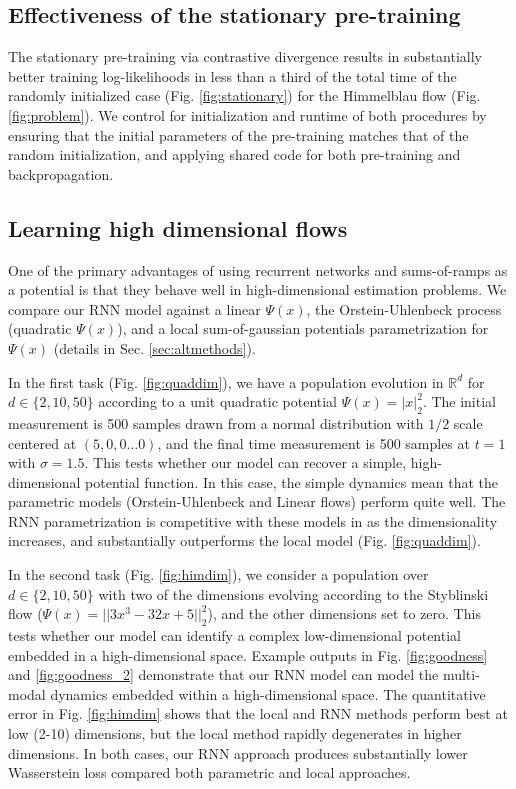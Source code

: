 \documentclass{article}
\begin{document}
\subsection{Effectiveness of the stationary pre-training}
The stationary pre-training via contrastive divergence results in substantially better training log-likelihoods in less than a third of the total time of the randomly initialized case (Fig. \ref{fig:stationary}) for the Himmelblau flow (Fig. \ref{fig:problem}). We control for initialization and runtime of both procedures by ensuring that the initial parameters of the pre-training matches that of the random initialization, and applying shared code for both pre-training and backpropagation.


\subsection{Learning high dimensional flows}

One of the primary advantages of using recurrent networks and sums-of-ramps as a potential is that they behave well in high-dimensional estimation problems. We compare our RNN model against a linear $\Psi(x)$, the Orstein-Uhlenbeck process (quadratic $\Psi(x)$), and a local sum-of-gaussian potentials parametrization for $\Psi(x)$ (details in Sec. \ref{sec:altmethods}).

In the first task (Fig. \ref{fig:quaddim}), we have a population evolution in $\mathbb{R}^d$ for $d\in \{2,10,50\}$ according to a unit quadratic potential $\Psi(x) = |x|_2^2$. The initial measurement is 500 samples drawn from a normal distribution with $1/2$ scale centered at $(5,0,0\hdots 0)$, and the final time measurement is 500 samples at $t=1$ with $\sigma=1.5$. This tests whether our model can recover a simple, high-dimensional potential function. In this case, the simple dynamics mean that the parametric models (Orstein-Uhlenbeck and Linear flows) perform quite well. The RNN parametrization is competitive with these models in as the dimensionality increases, and substantially outperforms the local model (Fig. \ref{fig:quaddim}).

In the second task (Fig. \ref{fig:himdim}), we consider a population over $d\in \{2,10,50\}$ with two of the dimensions evolving according to the Styblinski flow ($\Psi(x) = ||3x^3-32x+5||_2^2$), and the other dimensions set to zero. This tests whether our model can identify a complex low-dimensional potential embedded in a high-dimensional space. Example outputs in Fig. \ref{fig:goodness} and \ref{fig:goodness_2} demonstrate that our RNN model can model the multi-modal dynamics embedded within a high-dimensional space. The quantitative error in Fig. \ref{fig:himdim} shows that the local and RNN methods perform best at low (2-10) dimensions, but the local method rapidly degenerates in higher dimensions. In both cases, our RNN approach produces substantially lower Wasserstein loss compared both parametric and local approaches.
\end{document}
